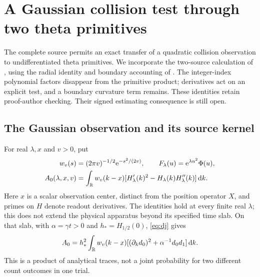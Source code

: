 \section{A Gaussian collision test through two theta primitives}
\label{sec:primitive}

The complete source permits an exact transfer of a quadratic collision
observation to undifferentiated theta primitives. We incorporate the
two-source calculation of \cite{TNDPrimitiveLattice}, using the radial
identity and boundary accounting of \cite{RadialThetaPrimitive,RadialThetaIBP}.
The integer-index polynomial factors disappear from the primitive product;
derivatives act on an explicit test, and a boundary curvature term remains.
These identities retain proof-author checking. Their signed estimating
consequence is still open.

\subsection{The Gaussian observation and its source kernel}
For real $\lambda,x$ and $v>0$, put
\begin{align}
 w_v(s)&=(2\pi v)^{-1/2}\mathrm e^{-s^2/(2v)},\qquad
 F_\lambda(u)=\mathrm e^{\lambda u^2}\Phi(u),\label{eq:primitiveweight}\\
 A_0(\lambda,x,v)&=\int_\mathbb R w_v(k-x)
       [H_\lambda'(k)^2-H_\lambda(k)H_\lambda''(k)]\,\mathrm d k.
 \label{eq:A0definition}
\end{align}
Here $x$ is a scalar observation center, distinct from the position operator
$X$, and primes on $H$ denote readout derivatives. The identities hold at
every finite real $\lambda$; this does not extend the physical apparatus
beyond its specified time slab. On that slab, with $\alpha=\gamma t>0$
and $h_*=H_{1/2}(0)$, \eqref{eq:dj} gives
\begin{equation}\label{eq:A0count}
 A_0=h_*^2\int_\mathbb R w_v(k-x)
       [(\partial_kd_0)^2+\alpha^{-1}d_0d_1]\,\mathrm d k.
\end{equation}
This is a product of analytical traces, not a joint probability for two
different count outcomes in one trial.


